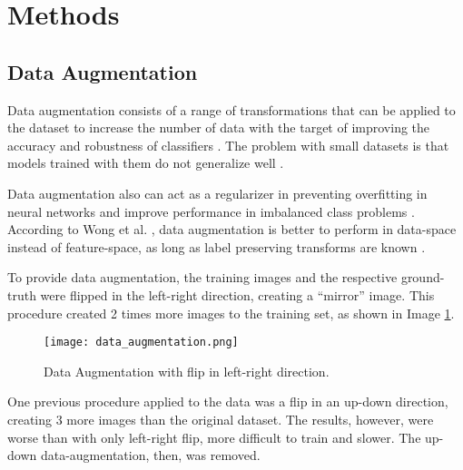 \documentclass[10pt,twocolumn,letterpaper]{article}
\begin{document}
\section{Methods} \label{sec:methods}


\subsection{Data Augmentation} \label{ssec:data_augmentation}

Data augmentation consists of a range of transformations that can be applied to the dataset to increase the number of data with the target of improving the accuracy and robustness of classifiers \cite{AUGM_ADAPT}. The problem with small datasets is that models trained with them do not generalize well \cite{AUGM_DEEP}.

Data augmentation also can act as a regularizer in preventing overfitting in neural networks and improve performance in imbalanced class problems \cite{DATA_AUGM}. According to Wong et al. \cite{DATA_AUGM}, data augmentation is better to perform in data-space instead of feature-space, as long as label preserving transforms are known \cite{DATA_AUGM}.

To provide data augmentation, the training images and the respective ground-truth were flipped in the left-right direction, creating a ``mirror'' image. This procedure created 2 times more images to the training set, as shown in Image \ref{fig:data_augmentation}. 

\begin{figure}[ht]
  \centering
  \texttt{[image: data\_augmentation.png]}
  \caption{Data Augmentation with flip in left-right direction.}
  \label{fig:data_augmentation}
\end{figure}

One previous procedure applied to the data was a flip in an up-down direction, creating 3 more images than the original dataset. The results, however, were worse than with only left-right flip, more difficult to train and slower. The up-down data-augmentation, then, was removed.
\end{document}
